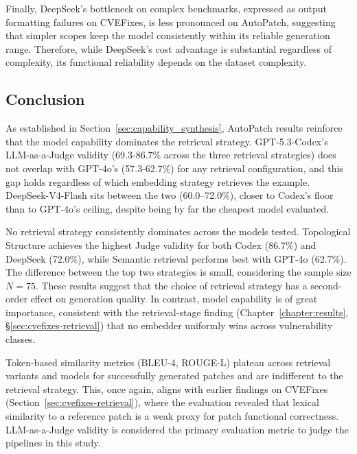 Finally, DeepSeek's bottleneck on complex benchmarks, expressed as output formatting failures on CVEFixes, is less pronounced on AutoPatch, suggesting that simpler scopes keep the model consistently within its reliable generation range. Therefore, while DeepSeek's cost advantage is substantial regardless of complexity, its functional reliability depends on the dataset complexity.

\subsection{Conclusion}

As established in Section~\ref{sec:capability_synthesis}, AutoPatch results reinforce that the model capability dominates the retrieval strategy. GPT-5.3-Codex's LLM-as-a-Judge validity (69.3-86.7\% across the three retrieval strategies) does not overlap with GPT-4o's (57.3-62.7\%) for any retrieval configuration, and this gap holds regardless of which embedding strategy retrieves the example. DeepSeek-V4-Flash sits between the two (60.0--72.0\%), closer to Codex's floor than to GPT-4o's ceiling, despite being by far the cheapest model evaluated.

No retrieval strategy consistently dominates across the models tested. Topological Structure achieves the highest Judge validity for both Codex (86.7\%) and DeepSeek (72.0\%), while Semantic retrieval performs best with GPT-4o (62.7\%). The difference between the top two strategies is small, considering the sample size $N=75$. These results suggest that the choice of retrieval strategy has a second-order effect on generation quality. In contrast, model capability is of great importance, consistent with the retrieval-stage finding (Chapter~\ref{chapter:results}, \S\ref{sec:cvefixes-retrieval}) that no embedder uniformly wins across vulnerability classes.

Token-based similarity metrics (BLEU-4, ROUGE-L) plateau across retrieval variants and models for successfully generated patches and are indifferent to the retrieval strategy. This, once again, aligns with earlier findings on CVEFixes (Section~\ref{sec:cvefixes-retrieval}), where the evaluation revealed that lexical similarity to a reference patch is a weak proxy for patch functional correctness. 
LLM-as-a-Judge validity is considered the primary evaluation metric to judge the pipelines in this study.

